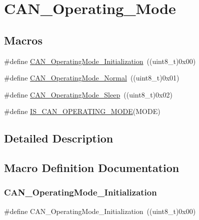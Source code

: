 \hypertarget{group___c_a_n___operating___mode}{}\section{C\+A\+N\+\_\+\+Operating\+\_\+\+Mode}
\label{group___c_a_n___operating___mode}
\subsection*{Macros}
\begin{DoxyCompactItemize}
\item 
\#define \mbox{\hyperlink{group___c_a_n___operating___mode_gace8a4b5c164aba6f473d6254ad1e8a36}{C\+A\+N\+\_\+\+Operating\+Mode\+\_\+\+Initialization}}~((uint8\+\_\+t)0x00)
\item 
\#define \mbox{\hyperlink{group___c_a_n___operating___mode_ga663ecffaa60d1a201a035dfa45325848}{C\+A\+N\+\_\+\+Operating\+Mode\+\_\+\+Normal}}~((uint8\+\_\+t)0x01)
\item 
\#define \mbox{\hyperlink{group___c_a_n___operating___mode_ga173b85d2baaa6249d966b8073e3ad8ca}{C\+A\+N\+\_\+\+Operating\+Mode\+\_\+\+Sleep}}~((uint8\+\_\+t)0x02)
\item 
\#define \mbox{\hyperlink{group___c_a_n___operating___mode_ga377f1598db9b0248ba83fa6e5a75db75}{I\+S\+\_\+\+C\+A\+N\+\_\+\+O\+P\+E\+R\+A\+T\+I\+N\+G\+\_\+\+M\+O\+DE}}(M\+O\+DE)
\end{DoxyCompactItemize}


\subsection{Detailed Description}


\subsection{Macro Definition Documentation}
\mbox{\label{group___c_a_n___operating___mode_gace8a4b5c164aba6f473d6254ad1e8a36}} 
\subsubsection{\texorpdfstring{CAN\_OperatingMode\_Initialization}{CAN\_OperatingMode\_Initialization}}
{\footnotesize\ttfamily \#define C\+A\+N\+\_\+\+Operating\+Mode\+\_\+\+Initialization~((uint8\+\_\+t)0x00)}

